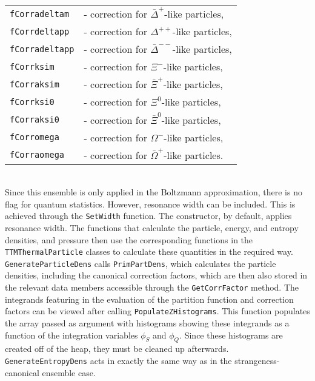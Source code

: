 \documentclass{elsarticle}
\begin{document}
\begin{tabular}{ll}
\texttt{fCorradeltam}    &- correction for $\bar{\Delta}^+$-like particles,\\
\texttt{fCorrdeltapp}    &- correction for $\Delta^{++}$-like particles,\\
\texttt{fCorradeltapp}   &- correction for $\bar{\Delta}^{--}$-like particles,\\
\texttt{fCorrksim}       &- correction for $\Xi^{-}$-like particles,\\
\texttt{fCorraksim}      &- correction for $\bar{\Xi}^+$-like particles,\\
\texttt{fCorrksi0}       &- correction for $\Xi^0$-like particles,\\
\texttt{fCorraksi0}      &- correction for $\bar{\Xi}^0$-like particles,\\
\texttt{fCorromega}      &- correction for $\Omega^-$-like particles,\\
\texttt{fCorraomega}     &- correction for $\bar{\Omega}^+$-like particles.
\end{tabular}\\

Since this ensemble is only applied in the Boltzmann approximation, there is no flag for quantum 
statistics. However, resonance width can be included. This is achieved through the 
\texttt{SetWidth} function. The constructor, by default, applies resonance width. The 
functions that calculate the particle, energy, and entropy densities, and pressure then use the 
corresponding functions in the \texttt{TTMThermalParticle} classes to calculate these 
quantities in the required way.\\ 

\texttt{GenerateParticleDens} calls \texttt{PrimPartDens}, which calculates the particle densities, 
including the canonical correction factors, which are then also stored in the relevant data members 
accessible through the \texttt{GetCorrFactor} method. The integrands featuring in the evaluation 
of the partition function and correction factors can be viewed after calling 
\texttt{PopulateZHistograms}. This function populates the array passed as argument with 
histograms showing these integrands as a function of the integration variables $\phi_S$ and 
$\phi_Q$. Since these histograms 
are created off of the heap, they must be cleaned up afterwards.\\ 

\texttt{GenerateEntropyDens} acts in exactly the same way as in the strangeness-canonical ensemble case.\\
\end{document}
